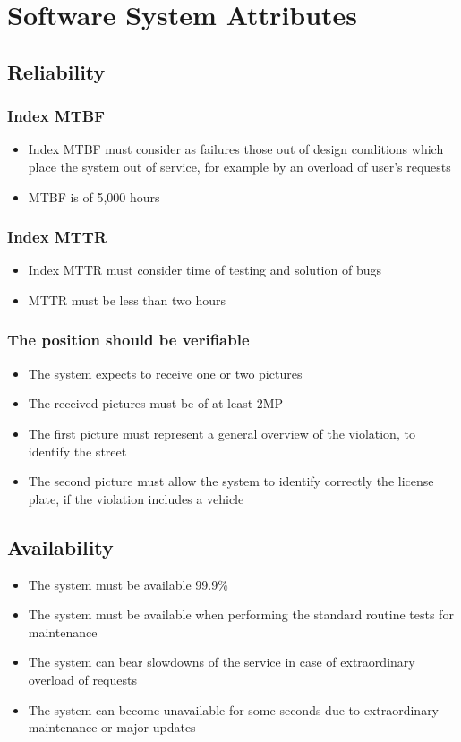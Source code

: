 \section{Software System Attributes}

\subsection{Reliability}
\subsubsection{Index MTBF}
\begin{itemize}
    \item Index MTBF must consider as failures those out of design conditions which place the system out of service, for example by an overload of user's requests
    \item MTBF is of 5,000 hours
\end{itemize}

\subsubsection{Index MTTR}
\begin{itemize}
    \item Index MTTR must consider time of testing and solution of bugs
    \item MTTR must be less than two hours
\end{itemize}

\subsubsection{The position should be verifiable}
\begin{itemize}
    \item The system expects to receive one or two pictures
    \item The received pictures must be of at least 2MP
    \item The first picture must represent a general overview of the violation, to identify the street
    \item The second picture must allow the system to identify correctly the license plate, if the violation includes a vehicle
\end{itemize}

\subsection{Availability}
\begin{itemize}
    \item The system must be available 99.9\%
    \item The system must be available when performing the standard routine tests for maintenance
    \item The system can bear slowdowns of the service in case of extraordinary overload of requests
    \item The system can become unavailable for some seconds due to extraordinary maintenance or major updates
\end{itemize}

